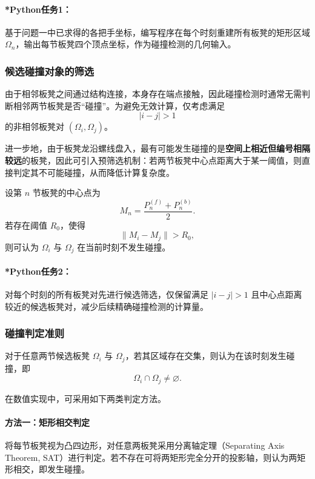 \documentclass[12pt,a4paper]{ctexart}
\begin{document}
\paragraph{*Python任务1：}
基于问题一中已求得的各把手坐标，编写程序在每个时刻重建所有板凳的矩形区域 $\Omega_n$，输出每节板凳四个顶点坐标，作为碰撞检测的几何输入。

\subsubsection{候选碰撞对象的筛选}
由于相邻板凳之间通过结构连接，本身存在端点接触，因此碰撞检测时通常无需判断相邻两节板凳是否“碰撞”。为避免无效计算，仅考虑满足
\begin{equation}
|i-j|>1
\end{equation}
的非相邻板凳对 $(\Omega_i,\Omega_j)$。

进一步地，由于板凳龙沿螺线盘入，最有可能发生碰撞的是\textbf{空间上相近但编号相隔较远}的板凳，因此可引入预筛选机制：若两节板凳中心点距离大于某一阈值，则直接判定其不可能碰撞，从而降低计算复杂度。

设第 $n$ 节板凳的中心点为
\begin{equation}
M_n=\frac{P_n^{(f)}+P_n^{(b)}}{2}.
\end{equation}
若存在阈值 $R_0$，使得
\begin{equation}
\|M_i-M_j\|>R_0,
\end{equation}
则可认为 $\Omega_i$ 与 $\Omega_j$ 在当前时刻不发生碰撞。

\paragraph{*Python任务2：}
对每个时刻的所有板凳对先进行候选筛选，仅保留满足 $|i-j|>1$ 且中心点距离较近的候选板凳对，减少后续精确碰撞检测的计算量。

\subsubsection{碰撞判定准则}
对于任意两节候选板凳 $\Omega_i$ 与 $\Omega_j$，若其区域存在交集，则认为在该时刻发生碰撞，即
\begin{equation}
\Omega_i \cap \Omega_j \neq \varnothing.
\end{equation}

在数值实现中，可采用如下两类判定方法。

\paragraph{方法一：矩形相交判定}
将每节板凳视为凸四边形，对任意两板凳采用分离轴定理（Separating Axis Theorem, SAT）进行判定。若不存在可将两矩形完全分开的投影轴，则认为两矩形相交，即发生碰撞。
\end{document}
